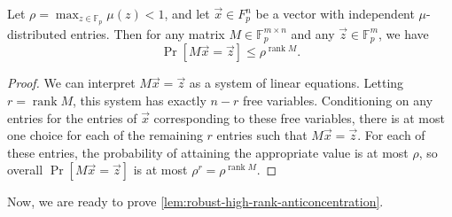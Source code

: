 \documentclass[10pt,reqno]{amsart}
\numberwithin{equation}{section}
\theoremstyle{remark}
\newcommand{\mb}{\mathbb}
\newcommand{\on}{\operatorname}
\begin{document}
\begin{lemma}\label{lem:simple-bound-linear-algebra}
Let $\rho=\max_{z\in\mb F_{p}}\mu(z)<1$, and let $\vec{x}\in F_{p}^n$
be a vector with independent $\mu$-distributed entries. Then for any matrix $M\in\mb F_{p}^{m\times n}$ and any
$\vec{z}\in\mb F_{p}^{m}$, we have
\[
\Pr[M\vec{x}=\vec{z}]\le\rho^{\on{rank} M}.
\]
\end{lemma}
\begin{proof}
    We can interpret $M\vec{x}=\vec{z}$ as a system of linear equations. Letting $r=\on{rank} M$, this system has exactly $n-r$ free variables. Conditioning on any entries for the entries of $\vec{x}$ corresponding to these free variables, there is at most one choice for each of the remaining $r$ entries such that $M\vec{x}=\vec{z}$. For each of these entries, the probability of attaining the appropriate value is at most $\rho$, so overall $\Pr[M\vec{x}=\vec{z}]$ is at most $\rho^r=\rho^{\on{rank} M}$.
\end{proof}

Now, we are ready to prove \cref{lem:robust-high-rank-anticoncentration}.
\end{document}
